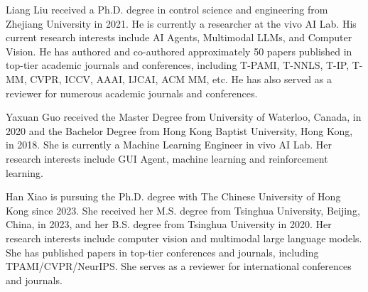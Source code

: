 \begin{IEEEbiography}{Liang Liu}
received a Ph.D. degree in control science and engineering from Zhejiang University in 2021. He is currently a researcher at the vivo AI Lab. His current research interests include AI Agents, Multimodal LLMs, and Computer Vision. He has authored and co-authored approximately 50 papers published in top-tier academic journals and conferences, including T-PAMI, T-NNLS, T-IP, T-MM, CVPR, ICCV, AAAI, IJCAI, ACM MM, etc. He has also served as a reviewer for numerous academic journals and conferences.
\end{IEEEbiography}

\vspace{-3em}

\begin{IEEEbiography}{Yaxuan Guo}
received the Master Degree from University of Waterloo, Canada, in 2020 and the Bachelor Degree from Hong Kong Baptist University, Hong Kong, in 2018. She is currently a Machine Learning Engineer in vivo AI Lab. Her research interests include GUI Agent, machine learning and reinforcement learning.
\end{IEEEbiography}

\vspace{-3em}

\begin{IEEEbiography}{Han Xiao}
is pursuing the Ph.D. degree with The Chinese University of Hong Kong since 2023. She received her M.S. degree from Tsinghua University, Beijing, China, in 2023, and her B.S. degree from Tsinghua University in 2020. Her research interests include computer vision and multimodal large language models. She has published papers in top-tier conferences and journals, including TPAMI/CVPR/NeurIPS. She serves as a reviewer for international conferences and journals.
\end{IEEEbiography}

